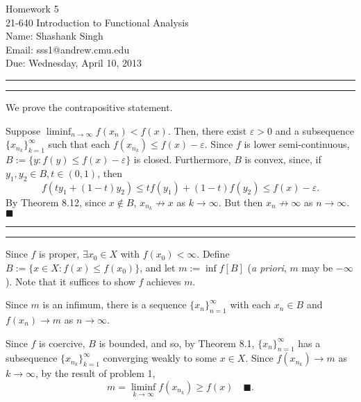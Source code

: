 \documentclass[11pt]{article}
\makeatletter
\newcounter{questionCounter}
\newcounter{partCounter}[questionCounter]
\newenvironment{question}[2][\arabic{questionCounter}]{%
    \setcounter{partCounter}{0}%
    \vspace{.25in} \hrule \vspace{0.5em}%
        \noindent{\bf #2}%
    \vspace{0.8em} \hrule \vspace{.10in}%
    \addtocounter{questionCounter}{1}%
}{}
\newcommand{\myname}{Shashank Singh}
\newcommand{\myandrew}{sss1@andrew.cmu.edu}
\newcommand{\myclass}{21-640 Introduction to Functional Analysis}
\newcommand{\myhwnum}{5}
\newcommand{\duedate}{Wednesday, April 10, 2013}
\renewcommand{\qed}{\quad $\blacksquare$}
\newcommand{\mqed}{\quad \blacksquare}
\newcommand{\e}{\varepsilon} %
\makeatother
\begin{document}
\thispagestyle{plain}

{\Large Homework \myhwnum} \\
\myclass \\
Name: \myname \\
Email: \myandrew \\
Due: \duedate

\begin{question}{Problem 1}
We prove the contrapositive statement.

Suppose $\liminf_{n \rightarrow \infty} f(x_n) < f(x)$. Then, there exist
$\e > 0$ and a subsequence $\{x_{n_k}\}_{k = 1}^{\infty}$ such that each
$f(x_{n_k}) \leq f(x) - \e$. Since $f$ is lower semi-continuous,
$B := \{y : f(y) \leq f(x) - \e\}$ is closed. Furthermore, $B$ is convex,
since, if $y_1,y_2 \in B, t \in (0,1)$, then
\[f(ty_1 + (1 - t)y_2) \leq tf(y_1) + (1 - t)f(y_2) \leq f(x) - \e.\]
By Theorem 8.12, since $x \notin B$,
$x_{n_k} \not\rightarrow x$ as $k \rightarrow \infty$. But then
$x_n \not\rightarrow \infty$ as $n \rightarrow \infty$. \qed
\end{question}

\begin{question}{Problem 2}
Since $f$ is proper, $\exists x_0 \in X$ with $f(x_0) < \infty$. Define
$B := \{x \in X : f(x) \leq f(x_0)\}$, and let $m := \inf f[B]$
(\emph{a priori}, $m$ may be $-\infty$). Note that it suffices to show $f$
achieves $m$.

Since $m$ is an infimum, there is a sequence $\{x_n\}_{n = 1}^{\infty}$ with
each $x_n \in B$ and $f(x_n) \rightarrow m$ as $n \rightarrow \infty$.

Since $f$ is coercive, $B$ is bounded, and so, by Theorem 8.1,
$\{x_n\}_{n = 1}^{\infty}$ has a subsequence $\{x_{n_k}\}_{k = 1}^{\infty}$
converging weakly to some $x \in X$. Since $f(x_{n_k}) \rightarrow m$ as
$k \rightarrow \infty$, by the result of problem 1,
\[m
    = \liminf_{k \rightarrow \infty} f(x_{n_k})
    \geq f(x)
\mqed.\]
\vspace{-0.2in}
\end{question}
\end{document}
